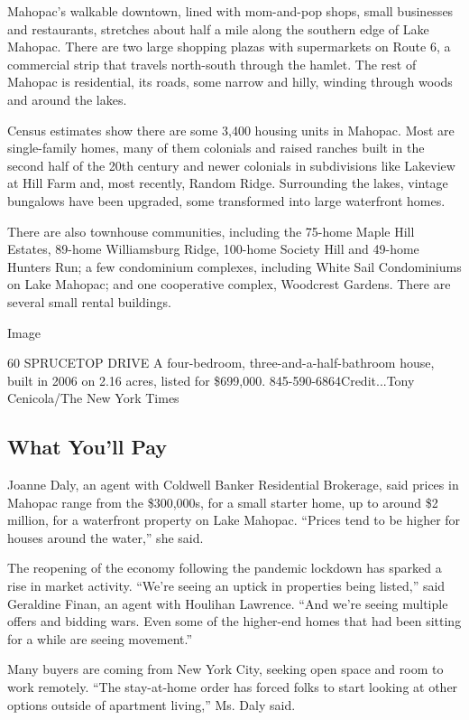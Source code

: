 Mahopac's walkable downtown, lined with mom-and-pop shops, small
businesses and restaurants, stretches about half a mile along the
southern edge of Lake Mahopac. There are two large shopping plazas with
supermarkets on Route 6, a commercial strip that travels north-south
through the hamlet. The rest of Mahopac is residential, its roads, some
narrow and hilly, winding through woods and around the lakes.

Census estimates show there are some 3,400 housing units in Mahopac.
Most are single-family homes, many of them colonials and raised ranches
built in the second half of the 20th century and newer colonials in
subdivisions like Lakeview at Hill Farm and, most recently, Random
Ridge. Surrounding the lakes, vintage bungalows have been upgraded, some
transformed into large waterfront homes.

There are also townhouse communities, including the 75-home Maple Hill
Estates, 89-home Williamsburg Ridge, 100-home Society Hill and 49-home
Hunters Run; a few condominium complexes, including White Sail
Condominiums on Lake Mahopac; and one cooperative complex, Woodcrest
Gardens. There are several small rental buildings.

Image

60 SPRUCETOP DRIVE \textbar{} A four-bedroom, three-and-a-half-bathroom
house, built in 2006 on 2.16 acres, listed for \$699,000.
845-590-6864Credit...Tony Cenicola/The New York Times

\hypertarget{what-youll-pay}{%
\subsection{What You'll Pay}\label{what-youll-pay}}

Joanne Daly, an agent with Coldwell Banker Residential Brokerage, said
prices in Mahopac range from the \$300,000s, for a small starter home,
up to around \$2 million, for a waterfront property on Lake Mahopac.
``Prices tend to be higher for houses around the water,'' she said.

The reopening of the economy following the pandemic lockdown has sparked
a rise in market activity. ``We're seeing an uptick in properties being
listed,'' said Geraldine Finan, an agent with Houlihan Lawrence. ``And
we're seeing multiple offers and bidding wars. Even some of the
higher-end homes that had been sitting for a while are seeing
movement.''

Many buyers are coming from New York City, seeking open space and room
to work remotely. ``The stay-at-home order has forced folks to start
looking at other options outside of apartment living,'' Ms. Daly said.

